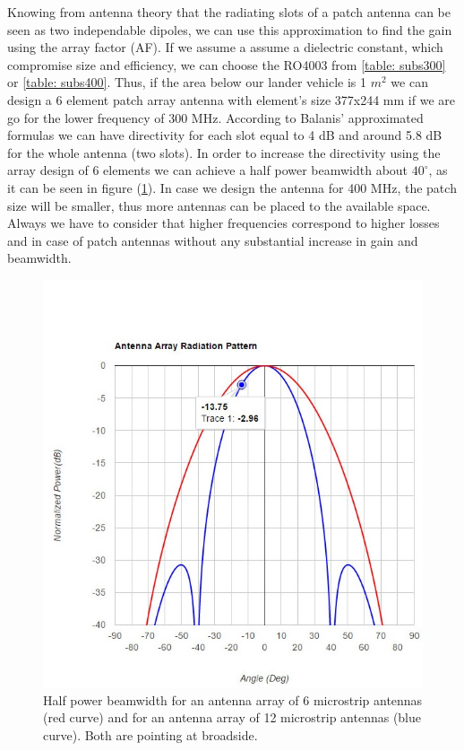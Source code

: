 Knowing from antenna theory that the radiating slots of a patch antenna can be seen as two independable dipoles, we can use this approximation to find the gain using the array factor (AF). If we assume a assume a dielectric constant, which compromise size and efficiency, we can choose the RO4003 from \ref{table: subs300} or \ref{table: subs400}. Thus, if the area below our lander vehicle is 1 $m^2$ we can design a 6 element patch array antenna with element's size 377x244 mm if we are go for the lower frequency of 300 MHz. According to Balanis' approximated formulas we can have directivity for each slot equal to 4 dB and around 5.8 dB for the whole antenna (two slots). In order to increase the directivity using the array design of 6 elements we can achieve a half power beamwidth about $40^{\circ}$, as it can be seen in figure (\ref{array}). In case we design the antenna for 400 MHz, the patch size will be smaller, thus more antennas can be placed to the available space. Always we have to consider that higher frequencies correspond to higher losses and in case of patch antennas without any substantial increase in gain and beamwidth.

\begin{figure}[ht]
\centering
\includegraphics[width=.75\textwidth]{figures/Yannis/2results.jpg}
\caption{Half power beamwidth for an antenna array of 6 microstrip antennas (red curve) and for an antenna array of 12 microstrip antennas (blue curve). Both are pointing at broadside.}
\label{array}
\end{figure}

